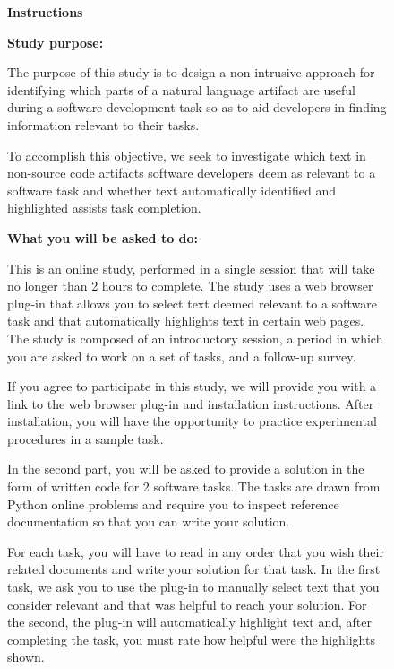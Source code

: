

\begin{figure}
\begin{mdframed}[backgroundcolor=gray!05] 
\begin{footnotesize}

{\large \textbf{Instructions}} \bigskip


\textbf{Study purpose:} \medskip

The purpose of this study is to design a non-intrusive approach for identifying which parts of a natural language artifact are useful during a software development task so as to aid developers in finding information relevant to their tasks.

To accomplish this objective, we seek to investigate which text in non-source code artifacts software developers deem as relevant to a software task and whether text automatically identified and highlighted assists task completion.
 \medskip

\textbf{What you will be asked to do:} \medskip


This  is an online study, performed in a single session that will take no longer than 2 hours to complete. The study uses a web browser plug-in that allows you to select text deemed relevant to a software task and that automatically highlights text in certain web pages. The study is composed of an introductory session, a period in which you are asked to work on a set of tasks, and a follow-up survey.  \medskip

If you agree to participate in this study, we will provide you with a link to the web browser plug-in and installation instructions. After installation, you will have the opportunity to practice experimental procedures in a sample task. \medskip

In the second part, you will be asked to provide a solution in the form of written code for 2 software tasks. The tasks are drawn from Python online problems and require you to inspect reference documentation so that you can write your solution.  \medskip

For each task, you will have to read in any order that you wish their related documents and write your solution for that task. In the first task, we ask you to use the plug-in to manually select text that you consider relevant and that was helpful to reach your solution. For the second, the plug-in will automatically highlight text and, after completing the task, you must rate how helpful were the highlights shown.  \medskip


\end{footnotesize}
\end{mdframed}
\end{figure}
